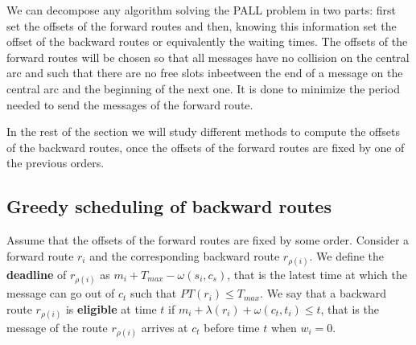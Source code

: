 \documentclass[10pt, conference, letterpaper]{IEEEtran}
\begin{document}
     We can decompose any algorithm solving the PALL problem in two parts: first set the offsets of the forward routes and then, knowing this information set the offset of the backward routes or equivalently the waiting times.  
     The offsets of the forward routes will be chosen so that all messages have no collision on the central arc and such that there are no free slots inbeetween the end of a message on the central arc and the beginning of the next one. 
     It is done to minimize the period needed to send the messages of the forward route.
%	 

   In the rest of the section we will study different methods to compute the offsets of the backward routes, once
   the offsets of the forward routes are fixed by one of the previous orders.
   
   \subsection{Greedy scheduling of backward routes}
    
    Assume that the offsets of the forward routes are fixed by some order. 
    Consider a forward route $r_i$ and the corresponding backward route $r_{\rho(i)}$.
    We define the {\bf deadline} of $r_{\rho(i)}$ as $m_{i} + T_{max} - \omega(s_i,c_s)$, that is the latest time at which the message can go out of $c_t$ such that $PT(r_i) \leq T_{max}$.
    We say that a backward route $r_{\rho(i)}$ is {\bf eligible} at time $t$ if $m_{i} +  \lambda(r_i) + \omega(c_t,t_i) \leq t$, that is the message of the route $r_{\rho(i)}$ arrives at $c_t$ before time $t$ when $w_i = 0$.
    
\end{document}
